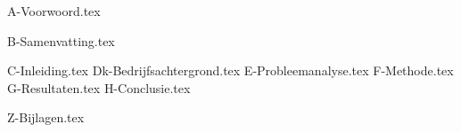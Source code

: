 \documentclass[10pt,a4paper,twoside]{report}
\begin{document}
\setcounter{page}{4} %

{A-Voorwoord.tex}

{B-Samenvatting.tex}

\setcounter{tocdepth}{1}
\tableofcontents
\thispagestyle{empty} %

{C-Inleiding.tex}
{Dk-Bedrijfsachtergrond.tex}
{E-Probleemanalyse.tex}
{F-Methode.tex}
{G-Resultaten.tex}
{H-Conclusie.tex}

\printglossary[title=Begrippenlijst]
\printbibliography
{} %

{Z-Bijlagen.tex}
\end{document}
